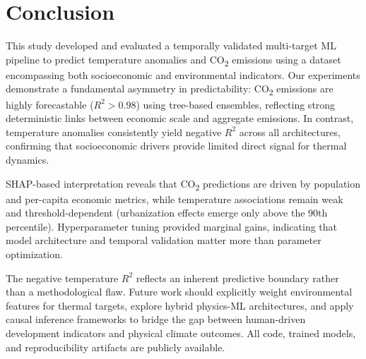 \documentclass[conference]{IEEEtran}
\begin{document}
\section{Conclusion}

This study developed and evaluated a temporally validated multi-target ML
pipeline to predict temperature anomalies and CO\textsubscript{2} emissions
using a dataset encompassing both socioeconomic and environmental indicators.
Our experiments demonstrate a fundamental asymmetry in predictability:
CO\textsubscript{2} emissions are highly forecastable ($R^2 > 0.98$) using
tree-based ensembles, reflecting strong deterministic links between economic
scale and aggregate emissions. In contrast, temperature anomalies consistently
yield negative $R^2$ across all architectures, confirming that socioeconomic
drivers provide limited direct signal for thermal dynamics.

SHAP-based interpretation reveals that CO\textsubscript{2} predictions are
driven by population and per-capita economic metrics, while temperature
associations remain weak and threshold-dependent (urbanization effects emerge
only above the 90th percentile). Hyperparameter tuning provided marginal gains,
indicating that model architecture and temporal validation matter more than
parameter optimization.

The negative temperature $R^2$ reflects an inherent predictive boundary rather
than a methodological flaw. Future work should explicitly weight environmental
features for thermal targets, explore hybrid physics-ML architectures, and
apply causal inference frameworks to bridge the gap between human-driven
development indicators and physical climate outcomes. All code, trained models,
and reproducibility artifacts are publicly available.
\end{document}
